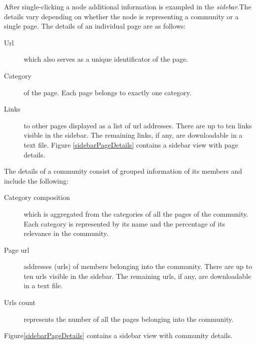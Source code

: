 After single-clicking a node additional information is exampled in the \textit{sidebar}.The details vary depending on whether the node is representing a community or a single page. 
The details of an individual page are as follows: 
\begin {description}
	\item [Url] which also serves as a unique identificator of the page. 
	\item [Category] of the page. Each page belongs to exactly one category.
	\item[Links] to other pages displayed as a list of url addresses. There are up to ten links visible in the sidebar. The remaining links, if any, are downloadable in a text file. 
Figure \ref{sidebarPageDetails} contains a sidebar view with page details.
\end{description}

The details of a community consist of grouped information of its members and include the following:
\begin {description}
	\item [Category composition] which is aggregated from the categories of all the pages of the community. Each category is represented by its name and the percentage of its relevance in the community.
	\item [Page url] addresses (urls) of members belonging into the community. There are up to ten urls visible in the sidebar. The remaining urls, if any, are downloadable in a text file. 
	\item[Urls count]represents the number of all the pages belonging into the community. 
\end{description}
Figure\ref{sidebarPageDetails} contains a sidebar view with community details.

